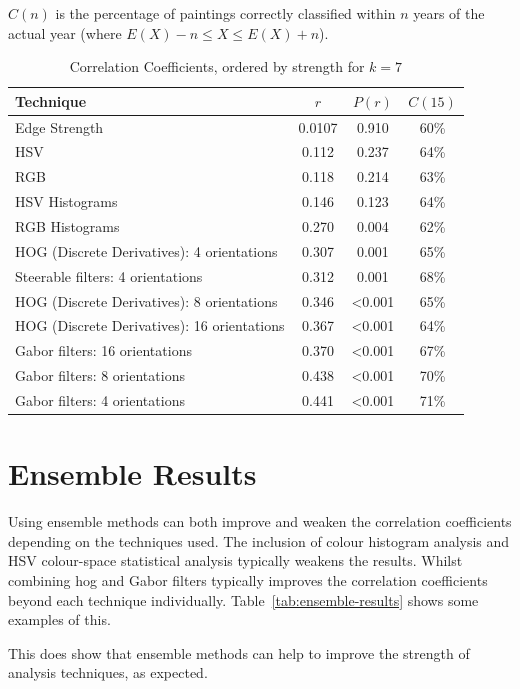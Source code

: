 $C(n)$ is the percentage of paintings correctly classified within $n$ years of the actual year 
(where $E(X)-n \le X \le E(X)+n$).

\begin{table}[h]
\centering
\begin{tabular}{|l|c|c|c|}\hline
Technique     					& $r$    & $P(r)$ & $C(15)$ \\ \hline
Edge Strength 					& 0.0107 & 0.910  & 60\%    \\
HSV 						& 0.112	 & 0.237  & 64\%    \\
RGB 						& 0.118  & 0.214  & 63\%    \\
HSV Histograms					& 0.146	 & 0.123  & 64\%    \\
RGB Histograms					& 0.270	 & 0.004  & 62\%    \\
HOG (Discrete Derivatives): 4 orientations 	& 0.307	 & 0.001  & 65\%    \\
Steerable filters: 4 orientations 		& 0.312	 & 0.001  & 68\%    \\
HOG (Discrete Derivatives): 8 orientations 	& 0.346	 & \textless0.001 & 65\% \\
HOG (Discrete Derivatives): 16 orientations 	& 0.367	 & \textless0.001 & 64\% \\
Gabor filters: 16 orientations			& 0.370  & \textless0.001 & 67\% \\
Gabor filters: 8 orientations			& 0.438	 & \textless0.001 & 70\% \\
Gabor filters: 4 orientations			& 0.441	 & \textless0.001 & 71\% \\
\hline
\end{tabular}
\caption{Correlation Coefficients, ordered by strength for $k=7$}\label{tab:r-results}
\end{table}


\newpage
\section{Ensemble Results}
Using ensemble methods can both improve and weaken the correlation coefficients depending on the
techniques used. The inclusion of colour histogram analysis and HSV colour-space statistical
analysis typically weakens the results. Whilst combining \gls{hog} and Gabor filters typically 
improves the correlation coefficients beyond each technique individually. 
Table~\ref{tab:ensemble-results} shows some examples of this.

This does show that ensemble methods can help to improve the strength of analysis techniques, as
expected.

